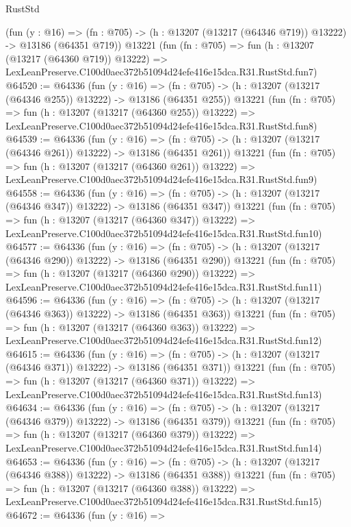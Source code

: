 \begin{lexlean}{RustStd}
\begin{coremodule}
    (fun (y : @16) =>
    (fn : @705) -> (h : @13207 (@13217 (@64346 @719)) @13222) -> @13186 (@64351 @719))
    @13221
    (fun (fn : @705) =>
    fun (h : @13207 (@13217 (@64360 @719)) @13222) =>
    LexLeanPreserve.C100d0aec372b51094d24efe416e15dca.R31.RustStd.fun7)
@64520 := @64336
    (fun (y : @16) =>
    (fn : @705) -> (h : @13207 (@13217 (@64346 @255)) @13222) -> @13186 (@64351 @255))
    @13221
    (fun (fn : @705) =>
    fun (h : @13207 (@13217 (@64360 @255)) @13222) =>
    LexLeanPreserve.C100d0aec372b51094d24efe416e15dca.R31.RustStd.fun8)
@64539 := @64336
    (fun (y : @16) =>
    (fn : @705) -> (h : @13207 (@13217 (@64346 @261)) @13222) -> @13186 (@64351 @261))
    @13221
    (fun (fn : @705) =>
    fun (h : @13207 (@13217 (@64360 @261)) @13222) =>
    LexLeanPreserve.C100d0aec372b51094d24efe416e15dca.R31.RustStd.fun9)
@64558 := @64336
    (fun (y : @16) =>
    (fn : @705) -> (h : @13207 (@13217 (@64346 @347)) @13222) -> @13186 (@64351 @347))
    @13221
    (fun (fn : @705) =>
    fun (h : @13207 (@13217 (@64360 @347)) @13222) =>
    LexLeanPreserve.C100d0aec372b51094d24efe416e15dca.R31.RustStd.fun10)
@64577 := @64336
    (fun (y : @16) =>
    (fn : @705) -> (h : @13207 (@13217 (@64346 @290)) @13222) -> @13186 (@64351 @290))
    @13221
    (fun (fn : @705) =>
    fun (h : @13207 (@13217 (@64360 @290)) @13222) =>
    LexLeanPreserve.C100d0aec372b51094d24efe416e15dca.R31.RustStd.fun11)
@64596 := @64336
    (fun (y : @16) =>
    (fn : @705) -> (h : @13207 (@13217 (@64346 @363)) @13222) -> @13186 (@64351 @363))
    @13221
    (fun (fn : @705) =>
    fun (h : @13207 (@13217 (@64360 @363)) @13222) =>
    LexLeanPreserve.C100d0aec372b51094d24efe416e15dca.R31.RustStd.fun12)
@64615 := @64336
    (fun (y : @16) =>
    (fn : @705) -> (h : @13207 (@13217 (@64346 @371)) @13222) -> @13186 (@64351 @371))
    @13221
    (fun (fn : @705) =>
    fun (h : @13207 (@13217 (@64360 @371)) @13222) =>
    LexLeanPreserve.C100d0aec372b51094d24efe416e15dca.R31.RustStd.fun13)
@64634 := @64336
    (fun (y : @16) =>
    (fn : @705) -> (h : @13207 (@13217 (@64346 @379)) @13222) -> @13186 (@64351 @379))
    @13221
    (fun (fn : @705) =>
    fun (h : @13207 (@13217 (@64360 @379)) @13222) =>
    LexLeanPreserve.C100d0aec372b51094d24efe416e15dca.R31.RustStd.fun14)
@64653 := @64336
    (fun (y : @16) =>
    (fn : @705) -> (h : @13207 (@13217 (@64346 @388)) @13222) -> @13186 (@64351 @388))
    @13221
    (fun (fn : @705) =>
    fun (h : @13207 (@13217 (@64360 @388)) @13222) =>
    LexLeanPreserve.C100d0aec372b51094d24efe416e15dca.R31.RustStd.fun15)
@64672 := @64336
    (fun (y : @16) =>

\end{coremodule}
\end{lexlean}
